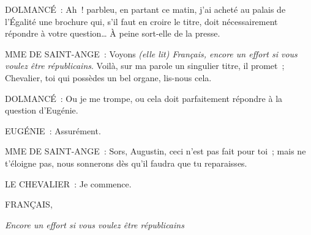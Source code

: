\documentclass[french,twoside]{book} %
\def\mednobreak{\ifdim\lastskip<\medskipamount
  \removelastskip\nopagebreak\medskip\fi}
\newcommand{\labelblock}[1]{\medbreak{\noindent\color{rubric}\bfseries #1}\par\mednobreak}
\begin{document}
DOLMANCÉ : Ah ! parbleu, en partant ce matin, j’ai acheté au palais de l’Égalité une brochure qui, s’il faut en croire le titre, doit nécessairement répondre à votre question… À peine sort-elle de la presse.\par
MME DE SAINT-ANGE : Voyons {\itshape (elle lit) Français, encore un effort si vous voulez être républicains}. Voilà, sur ma parole un singulier titre, il promet ; Chevalier, toi qui possèdes un bel organe, lis-nous cela.\par
DOLMANCÉ : Ou je me trompe, ou cela doit parfaitement répondre à la question d’Eugénie.\par
EUGÉNIE : Assurément.\par
MME DE SAINT-ANGE : Sors, Augustin, ceci n’est pas fait pour toi ; mais ne t’éloigne pas, nous sonnerons dès qu’il faudra que tu reparaisses.\par
LE CHEVALIER : Je commence.\par
{}
\label{d5\_francais}FRANÇAIS,\par
{\itshape Encore un effort si vous voulez être républicains}\par

\labelblock{LA RELIGION}
\end{document}
